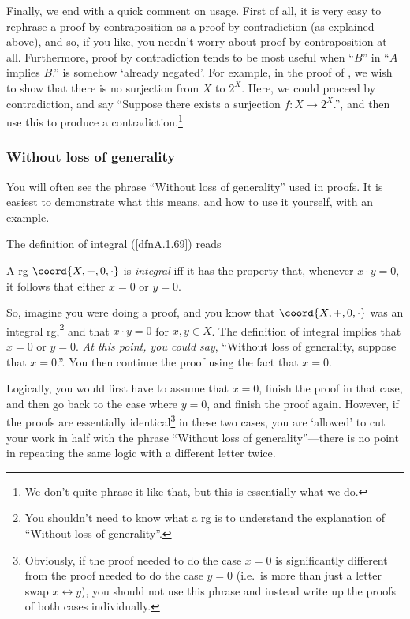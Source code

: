 Finally, we end with a quick comment on usage.  First of all, it is very easy to rephrase a proof by contraposition as a proof by contradiction (as explained above), and so, if you like, you needn't worry about proof by contraposition at all.  Furthermore, proof by contradiction tends to be most useful when ``$B$'' in ``$A$ implies $B$.'' is somehow `already negated'.  For example, in the proof of , we wish to show that there is no surjection from $X$ to $2^X$.  Here, we could proceed by contradiction, and say ``Suppose there exists a surjection $f\colon X\rightarrow 2^X$.'', and then use this to produce a contradiction.\footnote{We don't quite phrase it like that, but this is essentially what we do.} 

\subsubsection{Without loss of generality\textellipsis}

You will often see the phrase ``Without loss of generality\textellipsis'' used in proofs.  It is easiest to demonstrate what this means, and how to use it yourself, with an example.

The definition of integral (\cref{dfnA.1.69}) reads
\begin{displayquote}
A rg $\coord{X,+,0,\cdot}$ is \emph{integral} iff it has the property that, whenever $x\cdot y=0$, it follows that either $x=0$ or $y=0$.
\end{displayquote}
So, imagine you were doing a proof, and you know that $\coord{X,+,0,\cdot}$ was an integral rg,\footnote{You shouldn't need to know what a rg is to understand the explanation of ``Without loss of generality\textellipsis ''.} and that $x\cdot y=0$ for $x,y\in X$.  The definition of integral implies that $x=0$ or $y=0$.  \emph{At this point, you could say}, ``Without loss of generality, suppose that $x=0$.''.  You then continue the proof using the fact that $x=0$.

Logically, you would first have to assume that $x=0$, finish the proof in that case, and then go back to the case where $y=0$, and finish the proof again.  However, if the proofs are essentially identical\footnote{Obviously, if the proof needed to do the case $x=0$ is significantly different from the proof needed to do the case $y=0$ (i.e.~is more than just a letter swap $x\leftrightarrow y$), you should not use this phrase and instead write up the proofs of both cases individually.} in these two cases, you are `allowed' to cut your work in half with the phrase ``Without loss of generality\textellipsis ''---there is no point in repeating the same logic with a different letter twice.

